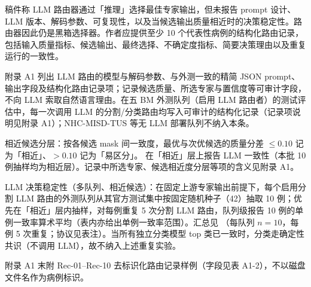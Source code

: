 \begin{reviewercomment}
稿件称 LLM 路由器通过「推理」选择最佳专家输出，但未报告 prompt 设计、LLM 版本、解码参数、可复现性，以及当候选输出质量相近时的决策稳定性。路由器因此仍是黑箱选择器。作者应提供至少 10 个代表性病例的结构化路由记录，包括输入质量指标、候选输出、最终选择、不确定度指标、简要决策理由以及重复运行的一致性。
\end{reviewercomment}
\begin{authorresponse}
附录 A1 列出 LLM 路由的模型与解码参数、与外测一致的精简 JSON prompt、输出字段及结构化路由记录项；记录候选质量、所选专家与置信度等可审计字段，不向 LLM 索取自然语言理由。在五 BM 外测队列（启用 LLM 路由者）的测试评估中，每一次调用 LLM 的分割/分类路由均写入可审计的结构化记录（记录项说明见附录 A1）；NHC-MISD-TUS 等无 LLM 部署队列不纳入本条。\par
相近候选分层：按各候选 mask 间一致度，最优与次优候选的质量分差 $\leq 0.10$ 记为「相近」、$>0.10$ 记为「易区分」。 在「相近」层上报告 LLM 一致性（本批 10 例抽样均为相近层）。记录中所选专家、候选相近度分层等项的含义见附录 A1。\par
LLM 决策稳定性（多队列、相近候选）：在固定上游专家输出前提下，每个启用分割 LLM 路由的外测队列从其官方测试集中按固定随机种子（42）抽取 10 例；优先在「相近」层内抽样，对每例重复 5 次分割 LLM 路由，队列级报告 10 例的单例一致率算术平均（表内亦给出单例一致率范围）。汇总见 （每队列 $n{=}10$，每例 5 次重复；协议见表注）。当所有独立分类模型 top 类已一致时，分类走确定性共识（不调用 LLM），故不纳入上述重复实验。\par
附录 A1 末附 Rec-01--Rec-10 去标识化路由记录样例（字段见表 A1-2），不以磁盘文件名作为病例标识。\par
\par
\end{authorresponse}

